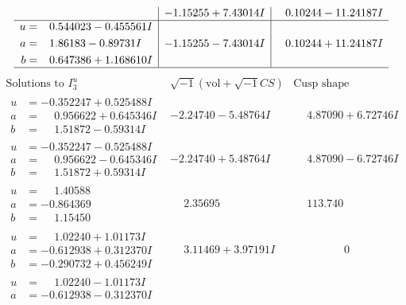 \documentclass[1p]{elsarticle_modified}
\theoremstyle{definition}
\newcommand{\I}{\sqrt{-1}}
\begin{document}
$$\begin{array}{c|c|c}
 & -1.15255 + 7.43014 I & \phantom{-}0.10244 - 11.24187 I \\ \hline\begin{aligned}
u &= \phantom{-}0.544023 - 0.455561 I \\
a &= \phantom{-}1.86183 - 0.89731 I \\
b &= \phantom{-}0.647386 + 1.168610 I\end{aligned}
 & -1.15255 - 7.43014 I & \phantom{-}0.10244 + 11.24187 I\\
 \hline 
 \end{array}$$\newpage$$\begin{array}{c|c|c}  
\text{Solutions to }I^u_{3}& \I (\text{vol} + \sqrt{-1}CS) & \text{Cusp shape}\\
 \hline 
\begin{aligned}
u &= -0.352247 + 0.525488 I \\
a &= \phantom{-}0.956622 + 0.645346 I \\
b &= \phantom{-}1.51872 - 0.59314 I\end{aligned}
 & -2.24740 - 5.48764 I & \phantom{-}4.87090 + 6.72746 I \\ \hline\begin{aligned}
u &= -0.352247 - 0.525488 I \\
a &= \phantom{-}0.956622 - 0.645346 I \\
b &= \phantom{-}1.51872 + 0.59314 I\end{aligned}
 & -2.24740 + 5.48764 I & \phantom{-}4.87090 - 6.72746 I \\ \hline\begin{aligned}
u &= \phantom{-}1.40588\phantom{ +0.000000I} \\
a &= -0.864369\phantom{ +0.000000I} \\
b &= \phantom{-}1.15450\phantom{ +0.000000I}\end{aligned}
 & \phantom{-}2.35695\phantom{ +0.000000I} & \phantom{-}113.740\phantom{ +0.000000I} \\ \hline\begin{aligned}
u &= \phantom{-}1.02240 + 1.01173 I \\
a &= -0.612938 + 0.312370 I \\
b &= -0.290732 + 0.456249 I\end{aligned}
 & \phantom{-}3.11469 + 3.97191 I & \phantom{-0.000000 } 0 \\ \hline\begin{aligned}
u &= \phantom{-}1.02240 - 1.01173 I \\
a &= -0.612938 - 0.312370 I \\

\end{aligned}
\end{array}$$
\end{document}
